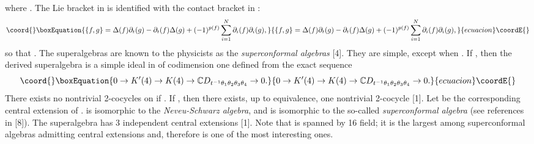 \documentclass[a4paper,a4paper]{article}
\begin{document}
where \coordHE{}.
The Lie bracket in \coordHE{} is identified with the contact bracket in 
\coordHE{}:
\begin{equation}\coord{}\boxEquation{
\lbrace f, g\rbrace = \Delta(f)\partial_t(g) - \partial_t(f)\Delta(g)
+ (-1)^{p(f)}\sum_{i=1}^N\partial_i(f)\partial_i(g), 
}{
\lbrace f, g\rbrace = \Delta(f)\partial_t(g) - \partial_t(f)\Delta(g)
+ (-1)^{p(f)}\sum_{i=1}^N\partial_i(f)\partial_i(g), 
}{ecuacion}\coordE{}\end{equation}
so that \coordHE{}.
The superalgebras \coordHE{} are known to the physicists as
the \coordHE{} {\it superconformal algebras} [4]. They are
simple, except when \coordHE{}. If \coordHE{},
then the derived superalgebra \coordHE{} is a simple ideal in
\coordHE{} of codimension one defined from the exact sequence
\begin{equation}\coord{}\boxEquation{
0\rightarrow K'(4)\rightarrow K(4)\rightarrow \mathbb C 
D_{t^{-1} \theta_1\theta_2\theta_3\theta_4}\rightarrow 0.
}{
0\rightarrow K'(4)\rightarrow K(4)\rightarrow \mathbb C 
D_{t^{-1} \theta_1\theta_2\theta_3\theta_4}\rightarrow 0.
}{ecuacion}\coordE{}\end{equation}
There exists no nontrivial 2-cocycles on \coordHE{} if \coordHE{}.
If \coordHE{}, then there exists, up to equivalence,
one nontrivial 2-cocycle [1]. Let \coordHE{} be the corresponding central 
extension of \coordHE{}. 
\coordHE{} is isomorphic to the  {\it Neveu-Schwarz algebra},
and \coordHE{} is isomorphic to the so-called 
\coordHE{}  {\it superconformal algebra} (see references in [8]).
The superalgebra \coordHE{} has 3 independent central extensions [1].
Note that \coordHE{} is spanned by 16 field; it is the largest 
among superconformal algebras admitting central extensions and, 
therefore is one of the most interesting ones.
\end{document}
